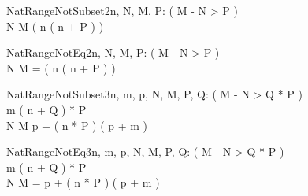 \begin{theorem}{NatRangeNotSubset2}{n, \const N, \const M, \const P: \nat}
\eval( M - N > P ) \\
N \upto M \subset ( n \upto ( n + P ) )
\end{theorem}

\begin{theorem}{NatRangeNotEq2}{n, \const N, \const M, \const P: \nat}
\eval( M - N > P ) \\
N \upto M = ( n \upto ( n + P ) )
\end{theorem}

\begin{theorem}{NatRangeNotSubset3}{n, m, p, \const N, \const M, \const P, \const Q: \nat}
\eval( M - N > Q * P ) \\
m \leq ( n + Q ) * P \\
N \upto M \subset p + ( n * P ) \upto ( p + m )
\end{theorem}

\begin{theorem}{NatRangeNotEq3}{n, m, p, \const N, \const M, \const P, \const Q: \nat}
\eval( M - N > Q * P ) \\
m \leq ( n + Q ) * P \\
N \upto M = p + ( n * P ) \upto ( p + m )
\end{theorem}

